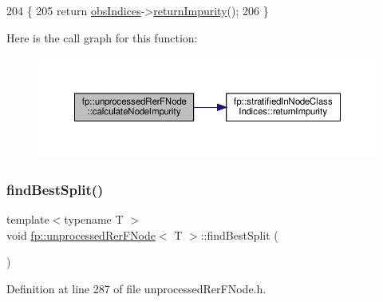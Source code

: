 \begin{DoxyCode}
204                                                     \{
205                     \textcolor{keywordflow}{return} \hyperlink{classfp_1_1unprocessedRerFNode_ad52d9d508bf378bc793b8cf961163735}{obsIndices}->\hyperlink{classfp_1_1stratifiedInNodeClassIndices_a044392c507fe54073f55f5ae6aceac5f}{returnImpurity}();
206                 \}
\end{DoxyCode}
Here is the call graph for this function\+:
\nopagebreak
\begin{figure}[H]
\begin{center}
\leavevmode
\includegraphics[width=350pt]{classfp_1_1unprocessedRerFNode_ac86ccad68a93a1957b7563244c03c0c0_cgraph}
\end{center}
\end{figure}
\mbox{\label{classfp_1_1unprocessedRerFNode_a92456de8922f84605246d2a1800434a1}} 
\subsubsection{\texorpdfstring{find\+Best\+Split()}{findBestSplit()}}
{\footnotesize\ttfamily template$<$typename T $>$ \\
void \hyperlink{classfp_1_1unprocessedRerFNode}{fp\+::unprocessed\+Rer\+F\+Node}$<$ T $>$\+::find\+Best\+Split (\begin{DoxyParamCaption}{ }\end{DoxyParamCaption})\hspace{0.3cm}{\ttfamily [inline]}}



Definition at line 287 of file unprocessed\+Rer\+F\+Node.\+h.



